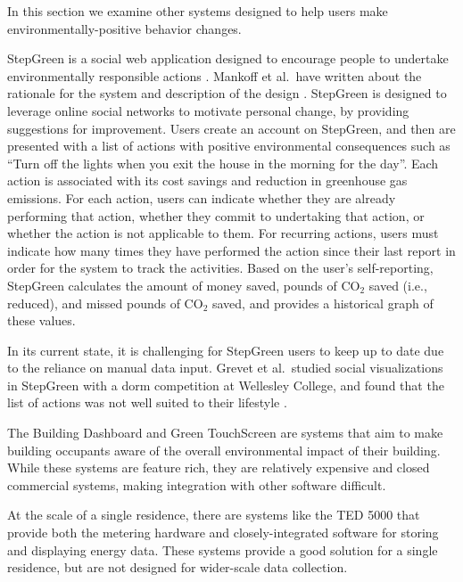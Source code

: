 In this section we examine other systems designed to help users make environmentally-positive behavior changes.

StepGreen is a social web application designed to encourage people to undertake environmentally responsible actions \cite{step-green-website}. Mankoff et al.\ have written about the rationale for the system and description of the design  \cite{Mankoff2007Leveraging-Soci}. StepGreen is designed to leverage online social networks to motivate personal change, by providing suggestions for improvement. Users create an account on StepGreen, and then are presented with a list of actions with positive environmental consequences such as ``Turn off the lights when you exit the house in the morning for the day''. Each action is associated with its cost savings and reduction in greenhouse gas emissions. For each action, users can indicate whether they are already performing that action, whether they commit to undertaking that action, or whether the action is not applicable to them. For recurring actions, users must indicate how many times they have performed the action since their last report in order for the system to track the activities. Based on the user's self-reporting, StepGreen calculates the amount of money saved, pounds of CO$_2$ saved (i.e., reduced), and missed pounds of CO$_2$ saved, and provides a historical graph of these values.

In its current state, it is challenging for StepGreen users to keep up to date due to the reliance on manual data input. Grevet et al.\ studied social visualizations in StepGreen with a dorm competition at Wellesley College, and found that the list of actions was not well suited to their lifestyle \cite{Grevet10}.

The Building Dashboard \cite{building-dashboard} and Green TouchScreen \cite{greentouchscreen} are systems that aim to make building occupants aware of the overall environmental impact of their building. While these systems are feature rich, they are relatively expensive and closed commercial systems, making integration with other software difficult.

At the scale of a single residence, there are systems like the TED 5000 \cite{the-energy-detective} that provide both the metering hardware and closely-integrated software for storing and displaying energy data. These systems provide a good solution for a single residence, but are not designed for wider-scale data collection.


